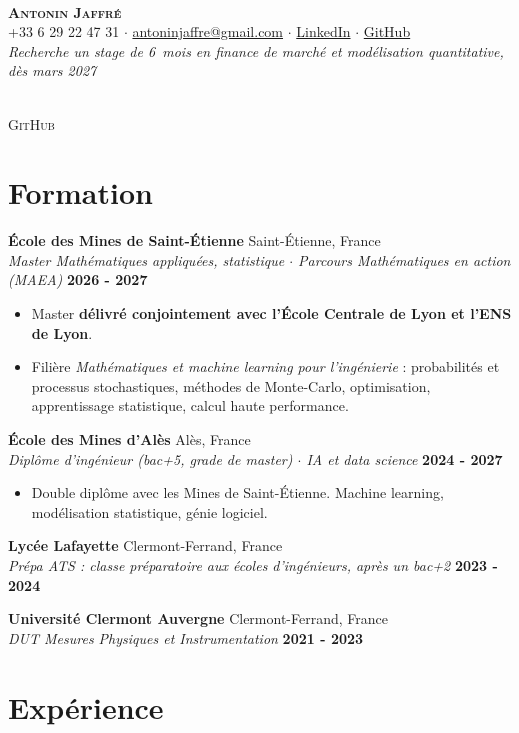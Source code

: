 \documentclass[a4paper,10pt]{article}
\newcommand{\makeheader}[4]{
    \noindent
    \begin{minipage}[c]{0.09\textwidth}~\end{minipage}%
    \hfill
    \begin{minipage}[c]{0.74\textwidth}
        \centering
        {\huge \textbf{\textsc{#1}}} \\ \vspace{6pt}
        #2 \\ \vspace{4pt}
        \small{\textit{#3}}
    \end{minipage}%
    \hfill
    \begin{minipage}[c]{0.15\textwidth}
        \raggedleft
        \qrcode[height=2.1cm]{#4} \\ \vspace{2pt}
        \tiny\textsc{GitHub}
    \end{minipage}
    \vspace{4pt}
}
\newcommand{\cventry}[4]{
    \vspace{2pt}
    \noindent \textbf{#1} \hfill #2 \\
    \noindent \textit{#3} \hfill \textbf{#4}
}
\newenvironment{cvbullets}{
    \begin{itemize}[itemsep=1.5pt, topsep=2pt, leftmargin=1.1em, label=\tiny$\bullet$]
}{
    \end{itemize} \vspace{1pt}
}
\begin{document}
\makeheader{Antonin Jaffré}
    {+33 6 29 22 47 31 $\cdot$ \href{mailto:antoninjaffre@gmail.com}{antoninjaffre@gmail.com} $\cdot$ \href{https://www.linkedin.com/in/antonin-jaffr\%C3\%A9}{LinkedIn} $\cdot$ \href{https://github.com/antojfr}{GitHub}}
    {Recherche un stage de 6~mois en finance de marché et modélisation quantitative, dès mars 2027}
    {https://github.com/antojfr}

\section{Formation}

\cventry{École des Mines de Saint-Étienne}{Saint-Étienne, France}{Master Mathématiques appliquées, statistique $\cdot$ Parcours Mathématiques en action (MAEA)}{2026 - 2027}
\begin{cvbullets}
    \item Master \textbf{délivré conjointement avec l'École Centrale de Lyon et l'ENS de Lyon}.
    \item Filière \textit{Mathématiques et machine learning pour l'ingénierie} : probabilités et processus stochastiques, méthodes de Monte-Carlo, optimisation, apprentissage statistique, calcul haute performance.
\end{cvbullets}

\cventry{École des Mines d'Alès}{Alès, France}{Diplôme d'ingénieur (bac+5, grade de master) $\cdot$ IA et data science}{2024 - 2027}
\begin{cvbullets}
    \item Double diplôme avec les Mines de Saint-Étienne. Machine learning, modélisation statistique, génie logiciel.
\end{cvbullets}

\cventry{Lycée Lafayette}{Clermont-Ferrand, France}{Prépa ATS : classe préparatoire aux écoles d'ingénieurs, après un bac+2}{2023 - 2024}

\cventry{Université Clermont Auvergne}{Clermont-Ferrand, France}{DUT Mesures Physiques et Instrumentation}{2021 - 2023}

\section{Expérience}
\end{document}
